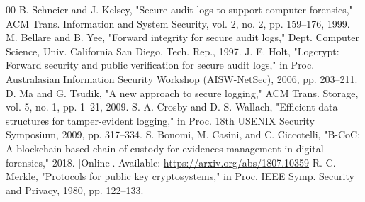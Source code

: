 \documentclass[conference]{IEEEtran}
\begin{document}
\begin{thebibliography}{00}
 B. Schneier and J. Kelsey, "Secure audit logs to support computer forensics," ACM Trans. Information and System Security, vol. 2, no. 2, pp. 159--176, 1999.
 M. Bellare and B. Yee, "Forward integrity for secure audit logs," Dept. Computer Science, Univ. California San Diego, Tech. Rep., 1997.
 J. E. Holt, "Logcrypt: Forward security and public verification for secure audit logs," in Proc. Australasian Information Security Workshop (AISW-NetSec), 2006, pp. 203--211.
 D. Ma and G. Tsudik, "A new approach to secure logging," ACM Trans. Storage, vol. 5, no. 1, pp. 1--21, 2009.
 S. A. Crosby and D. S. Wallach, "Efficient data structures for tamper-evident logging," in Proc. 18th USENIX Security Symposium, 2009, pp. 317--334.
 S. Bonomi, M. Casini, and C. Ciccotelli, "B-CoC: A blockchain-based chain of custody for evidences management in digital forensics," 2018. [Online]. Available: \url{https://arxiv.org/abs/1807.10359}
 R. C. Merkle, "Protocols for public key cryptosystems," in Proc. IEEE Symp. Security and Privacy, 1980, pp. 122--133.
\end{thebibliography}
\end{document}
